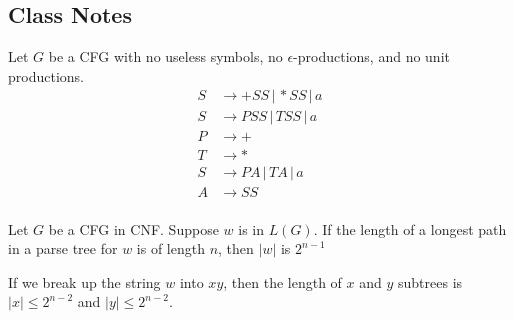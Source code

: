 \documentclass[]{article}
\begin{document}
  \subsection*{Class Notes}
    Let $G$ be a CFG with no useless symbols, no $\epsilon$-productions, and no
    unit productions.
      \begin{align*}
        S &\rightarrow +SS \, | \, *SS \, | \, a \\
        S &\rightarrow PSS \, | \, TSS \, | \, a \\
        P &\rightarrow +                         \\
        T &\rightarrow *                         \\
        S &\rightarrow PA  \, | \, TA  \, | \, a \\
        A &\rightarrow SS                        \\
      \end{align*}
      \begin{thm}
        Let $G$ be a CFG in CNF. Suppose $w$ is in $L(G)$. If the length of a
        longest path in a parse tree for $w$ is of length $n$, then $|w|$ is 
        $2^{n-1}$ 
      \end{thm}
    If we break up the string $w$ into $xy$, then the length of $x$ and $y$
    subtrees is $|x| \leq 2^{n-2}$ and $|y| \leq 2^{n-2}$.
  
\end{document}
